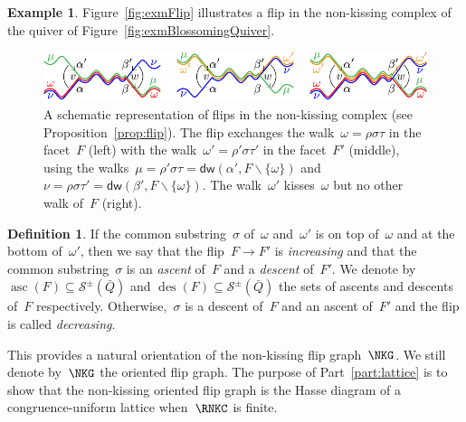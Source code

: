 \documentclass{amsart}
\theoremstyle{definition}
\newtheorem{definition}[theorem]{Definition}
\newtheorem{example}[theorem]{Example}
\newcommand{\ssm}{\smallsetminus} %
\DeclareMathOperator{\ascents}{asc} %
\DeclareMathOperator{\descents}{des} %
\newcommand{\fref}[1]{Figure~\ref{#1}} %
\newcommand{\darkblue}{\color{darkblue}} %
\newcommand{\defn}[1]{\textsl{\darkblue #1}} %
\newcommand{\strings}{\mathcal{S}} %
\newcommand{\distinguishedWalk}[2]{\mathsf{dw}(#1,#2)} %
\begin{document}
\begin{example}
\fref{fig:exmFlip} illustrates a flip in the non-kissing complex of the quiver of \fref{fig:exmBlossomingQuiver}.

\begin{figure}[t]
	\capstart
	\centerline{\includegraphics[scale=1]{flip}}
	\caption{A schematic representation of flips in the non-kissing complex (see Proposition~\ref{prop:flip}). The flip exchanges the walk~$\omega = \rho \sigma \tau$ in the facet~$F$ (left) with the walk~$\omega' = \rho' \sigma \tau'$ in the facet~$F'$ (middle), using the walks~$\mu = \rho' \sigma \tau = \distinguishedWalk{\alpha'}{F \ssm \{\omega\}}$ and~$\nu = \rho \sigma \tau' = \distinguishedWalk{\beta'}{F \ssm \{\omega\}}$. The walk~$\omega'$ kisses~$\omega$ but no other walk of~$F$ (right).}
	\label{fig:flip}
\end{figure}
\end{example}


\begin{definition}
\label{def:increasingFlip}
\enlargethispage{.3cm}
If the common substring~$\sigma$ of~$\omega$ and~$\omega'$ is on top of~$\omega$ and at the bottom of~$\omega'$, then we say that the flip~$F \to F'$ is \defn{increasing} and that the common substring~$\sigma$ is an \defn{ascent} of~$F$ and a \defn{descent} of~$F'$.
We denote by~$\ascents(F) \subseteq \strings^\pm(\bar Q)$ and $\descents(F) \subseteq \strings^\pm(\bar Q)$ the sets of ascents and descents of~$F$ respectively.
Otherwise,~$\sigma$ is a descent of~$F$ and an ascent of~$F'$ and the flip is called \defn{decreasing}.
\end{definition}

This provides a natural orientation of the non-kissing flip graph~$\NKG$.
We still denote by~$\NKG$ the oriented flip graph.
The purpose of Part~\ref{part:lattice} is to show that the non-kissing oriented flip graph is the Hasse diagram of a congruence-uniform lattice when~$\RNKC$ is finite.
\end{document}
